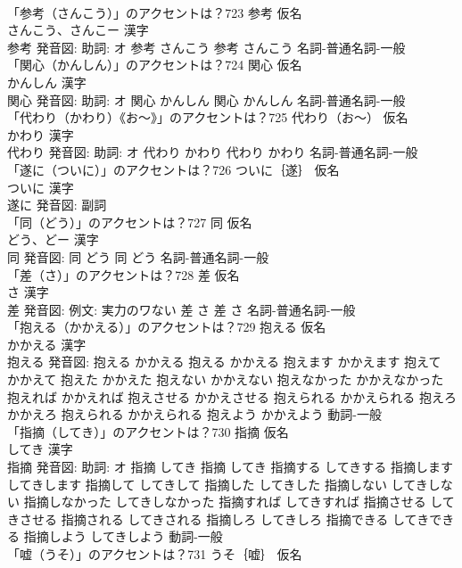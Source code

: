 \documentclass[8pt]{extreport}
\begin{document}
\begin{CJK}{UTF8}{min}
\\	「参考（さんこう）」のアクセントは？723	参考 仮名　
\\	さんこう、さんこー 漢字　
\\	参考 発音図: 助詞: オ	参考 さんこう		参考 さんこう				名詞-普通名詞-一般 
\\	「関心（かんしん）」のアクセントは？724	関心 仮名　
\\	かんしん 漢字　
\\	関心 発音図: 助詞: オ	関心 かんしん		関心 かんしん				名詞-普通名詞-一般 
\\	「代わり（かわり）《お〜》」のアクセントは？725	代わり（お〜） 仮名　
\\	かわり 漢字　
\\	代わり 発音図: 助詞: オ	代わり かわり		代わり かわり				名詞-普通名詞-一般 
\\	「遂に（ついに）」のアクセントは？726	ついに｛遂｝ 仮名　
\\	ついに 漢字　
\\	遂に 発音図:							副詞 
\\	「同（どう）」のアクセントは？727	同 仮名　
\\	どう、どー 漢字　
\\	同 発音図:	同 どう		同 どう				名詞-普通名詞-一般 
\\	「差（さ）」のアクセントは？728	差 仮名　
\\	さ 漢字　
\\	差 発音図: 例文: 実力のワない	差 さ		差 さ				名詞-普通名詞-一般 
\\	「抱える（かかえる）」のアクセントは？729	抱える 仮名　
\\	かかえる 漢字　
\\	抱える 発音図:	抱える かかえる		抱える かかえる 抱えます かかえます 抱えて かかえて 抱えた かかえた 抱えない かかえない 抱えなかった かかえなかった 抱えれば かかえれば 抱えさせる かかえさせる 抱えられる かかえられる 抱えろ かかえろ 抱えられる かかえられる 抱えよう かかえよう				動詞-一般 
\\	「指摘（してき）」のアクセントは？730	指摘 仮名　
\\	してき 漢字　
\\	指摘 発音図: 助詞: オ	指摘 してき		指摘 してき 指摘する してきする 指摘します してきします 指摘して してきして 指摘した してきした 指摘しない してきしない 指摘しなかった してきしなかった 指摘すれば してきすれば 指摘させる してきさせる 指摘される してきされる 指摘しろ してきしろ 指摘できる してきできる 指摘しよう してきしよう				動詞-一般 
\\	「嘘（うそ）」のアクセントは？731	うそ｛嘘｝ 仮名　

\end{CJK}
\end{document}
